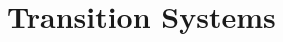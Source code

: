 \documentclass[acmsmall]{acmart}
\begin{document}


  
  


\begin{abstract}
A sketch of a subset construction for transition systems with hidden variables.
\end{abstract}


\section{Transition Systems}
\end{document}
